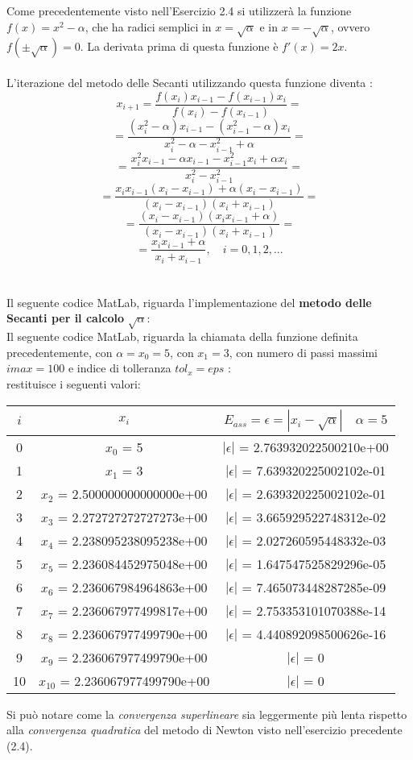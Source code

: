 Come precedentemente visto nell'Esercizio 2.4 si utilizzerà la funzione $f(x) = x^2-\alpha$, che ha radici semplici in $x=\sqrt{\alpha}$ e in $x=-\sqrt{\alpha}$, ovvero $f(\pm\sqrt{\alpha})=0$. La derivata prima di questa funzione è $f'(x)=2x$.\\\\
L'iterazione del metodo delle Secanti utilizzando questa funzione diventa :
\[
x_{i+1} = \frac{f(x_i)x_{i-1}-f(x_{i-1})x_i}{f(x_i)-f(x_{i-1})} =
\]
\[
= \frac{(x_i^2-\alpha)x_{i-1}-(x_{i-1}^2-\alpha)x_i}{x_i^2-\alpha-x_{i-1}^2+\alpha}  =
\]
\[
= \frac{x_i^2x_{i-1}-\alpha x_{i-1}-x_{i-1}^2x_i+\alpha x_i}{x_i^2-x_{i-1}^2} =
\]
\[
= \frac{x_ix_{i-1}(x_i-x_{i-1})+\alpha (x_i-x_{i-1})}{(x_i-x_{i-1})(x_i+x_{i-1})} =
\]
\[
= \frac{(x_i-x_{i-1})(x_ix_{i-1}+\alpha)}{(x_i-x_{i-1})(x_i+x_{i-1})} =
\]
\[
= \frac{x_ix_{i-1}+\alpha}{x_i+x_{i-1}},\quad i=0,1,2,...
\]\\\\
Il seguente codice MatLab, riguarda l'implementazione del \textbf{metodo delle Secanti per il calcolo} $\sqrt{\alpha}$:\\ 

Il seguente codice MatLab, riguarda la chiamata della funzione definita precedentemente, con $\alpha=x_0=5$, con $x_1=3$, con numero di passi massimi $imax=100$ e indice di tolleranza $tol_x=eps$ :\\

restituisce i seguenti valori:\\
\begin{center}
\begin{tabular}{|c|c|c|}
\hline
$i$ & $x_i$ & $E_{ass}=\epsilon=|x_i-\sqrt{\alpha}| \quad \alpha=5$ \\
\hline
    0 & $x_0$ = 5 & $|\epsilon|$ = 2.763932022500210e+00\\
    1 & $x_1$ = 3 & $|\epsilon|$ = 7.639320225002102e-01\\
    2 & $x_2$ = 2.500000000000000e+00 & $|\epsilon|$ = 2.639320225002102e-01\\
    3 & $x_3$ = 2.272727272727273e+00 & $|\epsilon|$ = 3.665929522748312e-02\\
    4 & $x_4$ = 2.238095238095238e+00 & $|\epsilon|$ = 2.027260595448332e-03\\
    5 & $x_5$ = 2.236084452975048e+00 & $|\epsilon|$ = 1.647547525829296e-05\\
    6 & $x_6$ = 2.236067984964863e+00 & $|\epsilon|$ = 7.465073448287285e-09\\
    7 & $x_7$ = 2.236067977499817e+00 & $|\epsilon|$ = 2.753353101070388e-14\\
    8 & $x_8$ = 2.236067977499790e+00 & $|\epsilon|$ = 4.440892098500626e-16\\
    9 & $x_9$ = 2.236067977499790e+00 & $|\epsilon|$ = 0\\
    10 & $x_{10}$ = 2.236067977499790e+00 & $|\epsilon|$ = 0\\
\hline
\end{tabular}
\end{center}
Si può notare come la \textit{convergenza superlineare} sia leggermente più lenta rispetto alla \textit{convergenza quadratica} del metodo di Newton visto nell'esercizio precedente (2.4).